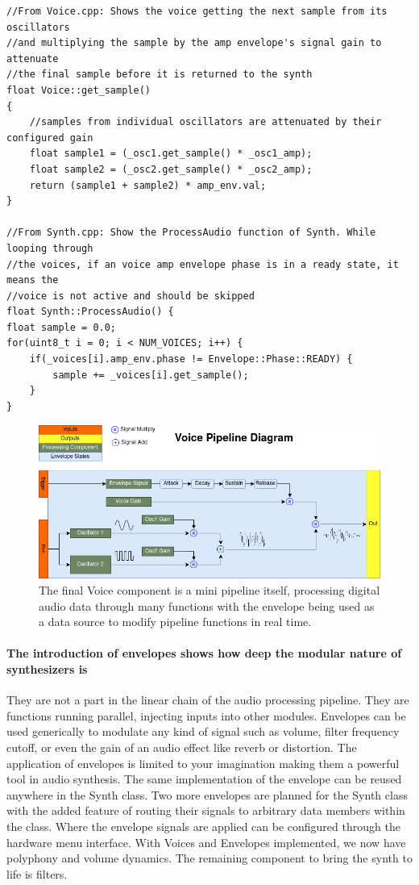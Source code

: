 \documentclass[acmlarge,screen]{acmart}
\begin{document}
	\begin{verbatim}
//From Voice.cpp: Shows the voice getting the next sample from its oscillators
//and multiplying the sample by the amp envelope's signal gain to attenuate
//the final sample before it is returned to the synth
float Voice::get_sample()
{   
	//samples from individual oscillators are attenuated by their configured gain
	float sample1 = (_osc1.get_sample() * _osc1_amp);
	float sample2 = (_osc2.get_sample() * _osc2_amp);
	return (sample1 + sample2) * amp_env.val;
}

//From Synth.cpp: Show the ProcessAudio function of Synth. While looping through
//the voices, if an voice amp envelope phase is in a ready state, it means the 
//voice is not active and should be skipped
float Synth::ProcessAudio() {
float sample = 0.0;
for(uint8_t i = 0; i < NUM_VOICES; i++) {
	if(_voices[i].amp_env.phase != Envelope::Phase::READY) {
		sample += _voices[i].get_sample();
	}
}
	\end{verbatim}

	\begin{figure}[H]
		\includegraphics[width=\linewidth]{Voice_Pipeline_Diagram}
		\caption{The final Voice component is a mini pipeline itself, processing digital audio data through many functions with the envelope being used as a data source to modify pipeline functions in real time.}
		\centering
	\end{figure}
	
	
	\paragraph{The introduction of envelopes shows how deep the modular nature of synthesizers is} They are not a part in the linear chain of the audio processing pipeline. They are functions running parallel, injecting inputs into other modules. Envelopes can be used generically to modulate any kind of signal such as volume, filter frequency cutoff, or even the gain of an audio effect like reverb or distortion. The application of envelopes is limited to your imagination making them a powerful tool in audio synthesis. The same implementation of the envelope can be reused anywhere in the Synth class. Two more envelopes are planned for the Synth class with the added feature of routing their signals to arbitrary data members within the class. Where the envelope signals are applied can be configured through the hardware menu interface. With Voices and Envelopes implemented, we now have polyphony and volume dynamics. The remaining component to bring the synth to life is filters.
\end{document}
